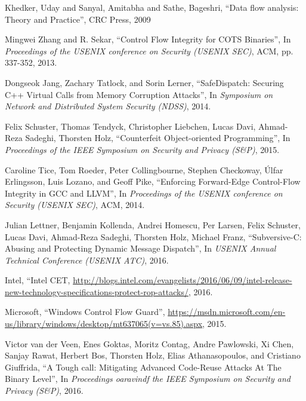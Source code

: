 \documentclass[11pt,a4paper,bibtotoc,idxtotoc,headsepline,footsepline,footexclude,BCOR20mm,DIV10]{scrbook}
\begin{document}
\begin{thebibliography}{50}



Khedker, Uday and Sanyal, Amitabha and Sathe, Bageshri,
``{Data flow analysis: Theory and Practice}'',
CRC Press, 2009

Mingwei Zhang and R. Sekar,
``{Control Flow Integrity for COTS Binaries}'', In
\emph{Proceedings of the USENIX conference on Security (USENIX SEC)}, ACM, pp. 337-352, 2013.

Dongseok Jang, Zachary Tatlock, and Sorin Lerner,
``{SafeDispatch: Securing C++ Virtual Calls from Memory Corruption Attacks}'', In
\emph{Symposium on Network and Distributed System Security (NDSS)}, 2014.

Felix Schuster, Thomas Tendyck, Christopher Liebchen, Lucas Davi, Ahmad-Reza Sadeghi, Thorsten Holz, 
``{Counterfeit Object-oriented Programming}'', In
\emph{Proceedings of the IEEE Symposium on Security and Privacy (S\&P)}, 2015.

Caroline Tice, Tom Roeder, Peter Collingbourne, Stephen Checkoway, 
Úlfar Erlingsson, Luis Lozano, and Geoff Pike, 
``{Enforcing Forward-Edge Control-Flow Integrity in GCC and LLVM}'', In
\emph{Proceedings of the USENIX conference on Security (USENIX SEC)}, ACM, 2014.

Julian Lettner, Benjamin Kollenda, Andrei Homescu, Per Larsen, Felix Schuster,
Lucas Davi, Ahmad-Reza Sadeghi, Thorsten Holz, Michael Franz,
``{Subversive-C: Abusing and Protecting Dynamic Message Dispatch}'', In
\emph{USENIX Annual Technical Conference (USENIX ATC)}, 2016.

Intel, ``{Intel CET},
\url{http://blogs.intel.com/evangelists/2016/06/09/intel-release-new-technology-specifications-protect-rop-attacks/}, 2016.

Microsoft,
``{Windows Control Flow Guard}'',
\url{https://msdn.microsoft.com/en-us/library/windows/desktop/mt637065(v=vs.85).aspx}, 2015.

Victor van der Veen, Enes Goktas, Moritz Contag, Andre Pawlowski, Xi Chen, Sanjay Rawat, 
Herbert Bos, Thorsten Holz, Elias Athanasopoulos, and Cristiano Giuffrida,
``{A Tough call: Mitigating Advanced Code-Reuse Attacks At The Binary Level}'', In
\emph{Proceedings oaravindf the IEEE Symposium on Security and Privacy (S\&P)}, 2016.


\end{thebibliography}
\end{document}
